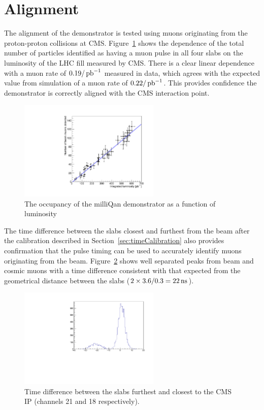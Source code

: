 \documentclass[12pt]{article}
\newcommand{\unit}[1]{\ensuremath{\text{\,#1}}\xspace}
\newcommand{\pbinv} {\mbox{\ensuremath{\,\text{pb}^{-1}}}\xspace}
\begin{document}
\section{Alignment}

The alignment of the demonstrator is tested using muons originating from the proton-proton collisions 
at CMS. Figure~\ref{fig:occ2d} shows the dependence of the total number of particles identified as having a muon pulse
in all four slabs on the luminosity of the LHC fill measured by CMS. There is a clear linear dependence with
a muon rate of $0.19/\pbinv$ measured in data, which agrees with the expected value from simulation
of a muon rate of $0.22/\pbinv$. This provides confidence the demonstrator is correctly aligned 
with the CMS interaction point.

\begin{figure}[ht!]
    \centering
    \includegraphics[width=0.6\textwidth]{figures/occ2d}
    \caption{\label{fig:occ2d} The occupancy of the milliQan demonstrator as a function of luminosity}
\end{figure}

The time difference between the slabs closest and furthest from the beam after the 
calibration described in Section~\ref{sec:timeCalibration} also provides confirmation
that the pulse timing can be used to accurately identify muons originating from the beam. 
Figure~\ref{fig:timeDiff} shows well separated peaks from beam and cosmic muons with a time difference
consistent with that expected from the geometrical distance between the slabs 
($2\times3.6/0.3 = 22\unit{ns}$).

\begin{figure}[ht!]
    \centering
    \includegraphics[width=0.6\textwidth]{figures/timeDiffSlabs}
    \caption{\label{fig:timeDiff} Time difference between the slabs furthest and closest to the CMS IP (channels 21 and 18 respectively).}
\end{figure}
\end{document}
